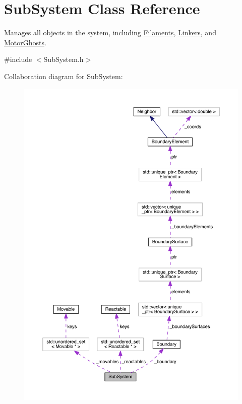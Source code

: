 \hypertarget{classSubSystem}{\section{Sub\+System Class Reference}
\label{classSubSystem}
}


Manages all objects in the system, including \hyperlink{classFilament}{Filaments}, \hyperlink{classLinker}{Linkers}, and \hyperlink{classMotorGhost}{Motor\+Ghosts}.  




{\ttfamily \#include $<$Sub\+System.\+h$>$}



Collaboration diagram for Sub\+System\+:\nopagebreak
\begin{figure}[H]
\begin{center}
\leavevmode
\includegraphics[width=350pt]{classSubSystem__coll__graph}
\end{center}
\end{figure}
